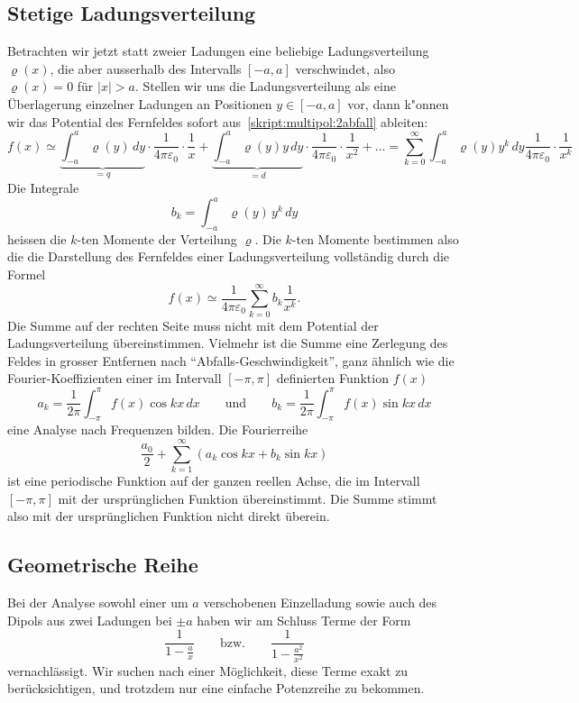\subsection{Stetige Ladungsverteilung%
\label{skript:multipol:section:stetigeladungsverteilung}}
Betrachten wir jetzt statt zweier Ladungen eine beliebige 
Ladungsverteilung $\varrho(x)$, die aber ausserhalb des Intervalls
$[-a,a]$ verschwindet, also $\varrho(x)=0$ für $|x|>a$.
Stellen wir uns die Ladungsverteilung als eine Überlagerung einzelner
Ladungen an Positionen $y\in[-a,a]$ vor, dann k"onnen wir das
Potential des Fernfeldes sofort aus~\eqref{skript:multipol:2abfall}
ableiten:
\[
f(x)
\simeq
\underbrace{\int_{-a}^a \varrho(y)\,dy }_{\displaystyle =q}\cdot
\frac{1}{4\pi\varepsilon_0}\cdot\frac1x
+
\underbrace{\int_{-a}^a \varrho(y)y \,dy}_{\displaystyle =d}\cdot
\frac{1}{4\pi\varepsilon_0}\cdot\frac1{x^2}
+
\dots
=
\sum_{k=0}^\infty\int_{-a}^a\varrho(y)y^k\,dy\frac{1}{4\pi\varepsilon_0}\cdot\frac1{x^k} 
\]
Die Integrale 
\[
b_k=\int_{-a}^a \varrho(y)\,y^k\,dy
\]
heissen die $k$-ten Momente der Verteilung $\varrho$.
Die $k$-ten Momente bestimmen also die die Darstellung des Fernfeldes
einer Ladungsverteilung vollständig durch die Formel
\[
f(x)
\simeq
\frac1{4\pi\varepsilon_0}\sum_{k=0}^\infty b_k\frac{1}{x^k}.
\]
Die Summe auf der rechten Seite muss nicht mit dem Potential der
Ladungsverteilung übereinstimmen.
Vielmehr ist die Summe eine Zerlegung des Feldes in grosser Entfernen
nach ``Abfalls-Geschwindigkeit'',
ganz ähnlich wie die Fourier-Koeffizienten einer im Intervall
$[-\pi,\pi]$ definierten Funktion $f(x)$
\[
a_k=\frac1{2\pi}\int_{-\pi}^\pi f(x)\cos kx\,dx
\qquad\text{und}\qquad
b_k=\frac1{2\pi}\int_{-\pi}^\pi f(x)\sin kx\,dx
\]
eine Analyse nach Frequenzen bilden.
Die Fourierreihe
\[
\frac{a_0}2+\sum_{k=1}^\infty (a_k\cos kx+b_k\sin kx)
\]
ist eine periodische Funktion auf der ganzen reellen Achse, die
im Intervall $[-\pi,\pi]$ mit der ursprünglichen Funktion übereinstimmt.
Die Summe stimmt also mit der ursprünglichen Funktion nicht direkt
überein.

\subsection{Geometrische Reihe%
\label{skript:multipol:section:geometrischereihe}}
Bei der Analyse sowohl einer um $a$ verschobenen Einzelladung sowie auch
des Dipols aus zwei Ladungen bei $\pm a$ haben wir am Schluss Terme der
Form
\[
\frac1{1-\frac{a}{x}}
\qquad\text{bzw.}\qquad
\frac1{1-\frac{a^2}{x^2}}
\]
vernachlässigt.
Wir suchen nach einer Möglichkeit, diese Terme exakt zu berücksichtigen,
und trotzdem nur eine einfache Potenzreihe zu bekommen.

